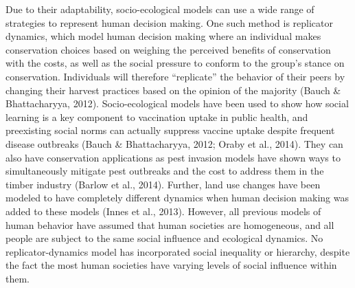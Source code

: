 \documentclass[
]{article}
\begin{document}
Due to their adaptability, socio-ecological models can use a wide range of strategies to represent human decision making. One such method is replicator dynamics, which model human decision making where an individual makes conservation choices based on weighing the perceived benefits of conservation with the costs, as well as the social pressure to conform to the group's stance on conservation. Individuals will therefore ``replicate'' the behavior of their peers by changing their harvest practices based on the opinion of the majority (Bauch \& Bhattacharyya, 2012). Socio-ecological models have been used to show how social learning is a key component to vaccination uptake in public health, and preexisting social norms can actually suppress vaccine uptake despite frequent disease outbreaks (Bauch \& Bhattacharyya, 2012; Oraby et al., 2014). They can also have conservation applications as pest invasion models have shown ways to simultaneously mitigate pest outbreaks and the cost to address them in the timber industry (Barlow et al., 2014). Further, land use changes have been modeled to have completely different dynamics when human decision making was added to these models (Innes et al., 2013). However, all previous models of human behavior have assumed that human societies are homogeneous, and all people are subject to the same social influence and ecological dynamics. No replicator-dynamics model has incorporated social inequality or hierarchy, despite the fact the most human societies have varying levels of social influence within them.
\end{document}

